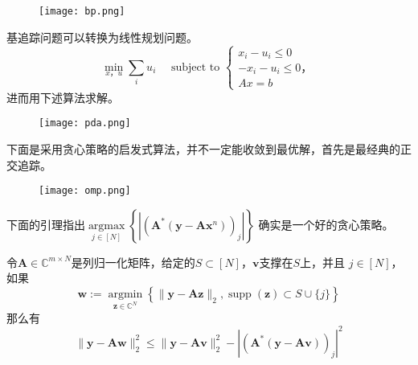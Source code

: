 \begin{figure}[!htbp]
    \centering
    \texttt{[image: bp.png]}
\end{figure}
基追踪问题可以转换为线性规划问题。
\begin{equation}
    \min _{x，u} \sum_i u_i \quad \text { subject to } \begin{cases}
    x_i-u_i  \leq 0 \\
    -x_i-u_i  \leq 0，\\
    A x  =b
    \end{cases}
\end{equation}
进而用下述算法求解。\par
\begin{figure}[!htbp]
    \centering
    \texttt{[image: pda.png]}
\end{figure}
下面是采用贪心策略的启发式算法，并不一定能收敛到最优解，首先是最经典的正交追踪。\par
\begin{figure}[!htbp]
    \centering
    \texttt{[image: omp.png]}
\end{figure}
下面的引理指出$\underset{j \in[N]}{\operatorname{argmax}}\left\{\left|\left(\mathbf{A}^*\left(\mathbf{y}-\mathbf{A} \mathbf{x}^n\right)\right)_j\right|\right\}$
确实是一个好的贪心策略。
\begin{lemma}
    令$\mathbf{A} \in \mathbb{C}^{m \times N}$是列归一化矩阵，给定的$S \subset[N]$，$\mathbf{v}$支撑在$S$上，并且
    $j \in[N]$，如果
    \begin{equation}
        \mathbf{w}:=\underset{\mathbf{z} \in \mathbb{C}^N}{\operatorname{argmin}}\left\{\|\mathbf{y}-\mathbf{A z}\|_2,\operatorname{supp}(\mathbf{z}) \subset S \cup\{j\}\right\}
    \end{equation}
    那么有
    \begin{equation}
        \|\mathbf{y}-\mathbf{A} \mathbf{w}\|_2^2 \leq\|\mathbf{y}-\mathbf{A v}\|_2^2-\left|\left(\mathbf{A}^*(\mathbf{y}-\mathbf{A} \mathbf{v})\right)_j\right|^2
    \end{equation}
\end{lemma}
